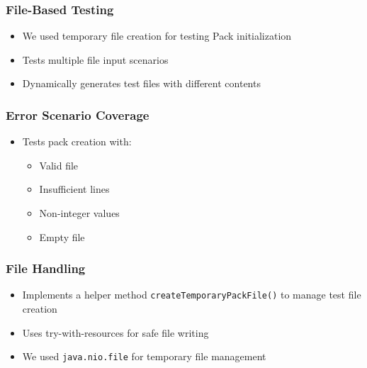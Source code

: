 \documentclass{article}
\begin{document}
\subsubsection{File-Based Testing}
\begin{itemize}
    \item We used temporary file creation for testing Pack initialization
    \item Tests multiple file input scenarios
    \item Dynamically generates test files with different contents
\end{itemize}

\subsubsection{Error Scenario Coverage}
\begin{itemize}
    \item Tests pack creation with:
          \begin{itemize}
              \item Valid file
              \item Insufficient lines
              \item Non-integer values
              \item Empty file
          \end{itemize}
\end{itemize}

\subsubsection{File Handling}
\begin{itemize}
    \item Implements a helper method \texttt{createTemporaryPackFile()} to manage test file creation
    \item Uses try-with-resources for safe file writing
    \item We used \texttt{java.nio.file} for temporary file management
\end{itemize}
\end{document}
